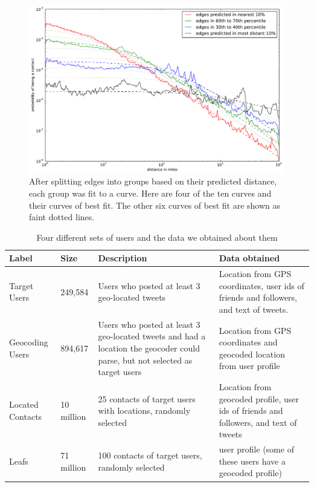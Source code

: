 \documentclass[letterpaper]{article}
\begin{document}
\begin{figure}[tb]
\centering
\includegraphics[width=.9\linewidth]{figures/vect_fit.pdf}
\caption{
After splitting edges into groups based on their predicted distance, each group
was fit to a curve.
%
Here are four of the ten curves and their curves of best
fit.
%
The other six curves of best fit are shown as faint dotted lines.}
\label{fig:NearProbFit}
\vspace{-2pt}
\end{figure}



\begin{table}[tb]
\scriptsize
\centering
\begin{tabular}{l l p{4cm} p{6cm}}
    Label & Size & Description & Data obtained \\
    \hline
    Target Users & 249,584 & Users who posted at least 3 geo-located tweets &
    Location from GPS coordinates, user ids of friends and followers,
    and text of tweets. \\
    Geocoding Users & 894,617 & Users who posted at least 3 geo-located tweets
    and had a location the geocoder could parse, but not selected as target users &
    Location from GPS coordinates and geocoded location from user profile \\
    Located Contacts & 10 million & 25 contacts of target users with locations, randomly selected &
    Location from geocoded profile, user ids of friends and followers, and text of tweets \\
    Leafs & 71 million & 100 contacts of target users, randomly selected &
    user profile (some of these users have a geocoded profile)\\
\end{tabular}
\caption{Four different sets of users and the data we obtained about them}
\label{tab:datasets}
\end{table}
\end{document}
